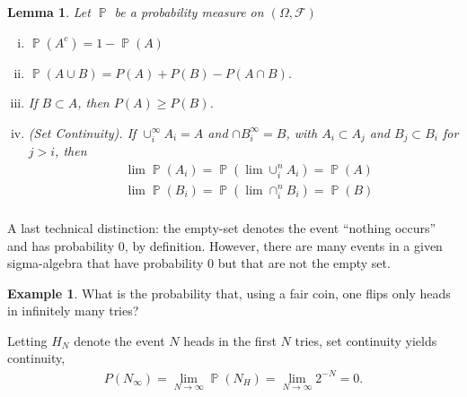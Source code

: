 \documentclass[12pt]{amsbook}
\newcommand{\filter}{\mathcal{F}}
\DeclareMathOperator{\prob}{\mathbb{P}}
\theoremstyle{plain}
\newtheorem{lemma}[theorem]{Lemma}
\theoremstyle{definition}
\newtheorem*{example}{Example}
\theoremstyle{remark}
\numberwithin{equation}{section}  %
\numberwithin{equation}{section}  %
\begin{document}
\begin{lemma}
	Let $\prob$ be a probability measure on $(\Omega, \filter)$
	\begin{enumerate}[(i)]
		\item $\prob(A^c) = 1 - \prob(A)$
		\item $\prob(A \cup B) = P(A) + P(B) - P(A \cap B)$.
		\item If $B \subset A$, then $P(A) \ge P(B)$.
		\item \emph{(Set Continuity)}.
			If $\cup_i^\infty A_i = A$ and
			$\cap B_i^\infty = B$, with $A_i \subset A_j$ and $B_j \subset B_i$ 
			for $j > i$,
			then
			\begin{align*}
				& \lim \prob(A_i) = \prob(\lim \cup_i^n A_i) = \prob(A) \\
				& \lim \prob(B_i) = \prob(\lim \cap_i^n B_i) = \prob(B) \\
			\end{align*}
	\end{enumerate}
\end{lemma}
A last technical distinction: the empty-set denotes the event ``nothing
occurs'' and has probability $0$, by definition. However, there are many
events in a given sigma-algebra that have probability $0$ but that are not the
empty set.

\begin{example}What is the probability that, using a fair coin, one
	flips only heads in infinitely many tries? 
\end{example}
Letting $H_N$ denote the event
$N$ heads in the first $N$ tries, set continuity yields
continuity,
\begin{align*}
	P(N_\infty) = \lim_{N \to \infty} \prob(N_H) = \lim_{N \to \infty} 2^{-N} = 
	0.
\end{align*}
\end{document}
